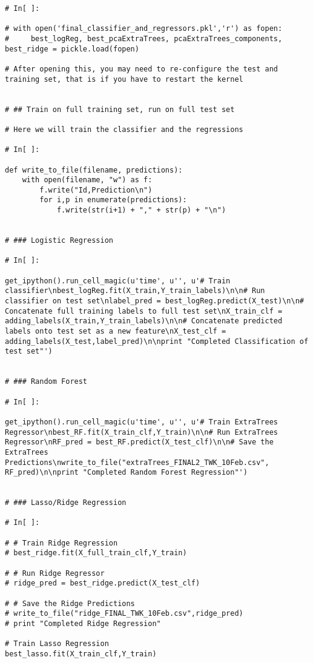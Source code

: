 \documentclass[11pt, oneside]{article}   	%
\begin{document}
\begin{lstlisting}
# In[ ]:

# with open('final_classifier_and_regressors.pkl','r') as fopen:
#     best_logReg, best_pcaExtraTrees, pcaExtraTrees_components, best_ridge = pickle.load(fopen)
    
# After opening this, you may need to re-configure the test and training set, that is if you have to restart the kernel


# ## Train on full training set, run on full test set

# Here we will train the classifier and the regressions

# In[ ]:

def write_to_file(filename, predictions):
    with open(filename, "w") as f:
        f.write("Id,Prediction\n")
        for i,p in enumerate(predictions):
            f.write(str(i+1) + "," + str(p) + "\n")


# ### Logistic Regression

# In[ ]:

get_ipython().run_cell_magic(u'time', u'', u'# Train classifier\nbest_logReg.fit(X_train,Y_train_labels)\n\n# Run classifier on test set\nlabel_pred = best_logReg.predict(X_test)\n\n# Concatenate full training labels to full test set\nX_train_clf = adding_labels(X_train,Y_train_labels)\n\n# Concatenate predicted labels onto test set as a new feature\nX_test_clf = adding_labels(X_test,label_pred)\n\nprint "Completed Classification of test set"')


# ### Random Forest

# In[ ]:

get_ipython().run_cell_magic(u'time', u'', u'# Train ExtraTrees Regressor\nbest_RF.fit(X_train_clf,Y_train)\n\n# Run ExtraTrees Regressor\nRF_pred = best_RF.predict(X_test_clf)\n\n# Save the ExtraTrees Predictions\nwrite_to_file("extraTrees_FINAL2_TWK_10Feb.csv", RF_pred)\n\nprint "Completed Random Forest Regression"')


# ### Lasso/Ridge Regression

# In[ ]:

# # Train Ridge Regression
# best_ridge.fit(X_full_train_clf,Y_train)

# # Run Ridge Regressor
# ridge_pred = best_ridge.predict(X_test_clf)

# # Save the Ridge Predictions
# write_to_file("ridge_FINAL_TWK_10Feb.csv",ridge_pred)
# print "Completed Ridge Regression"

# Train Lasso Regression
best_lasso.fit(X_train_clf,Y_train)


\end{lstlisting}
\end{document}
